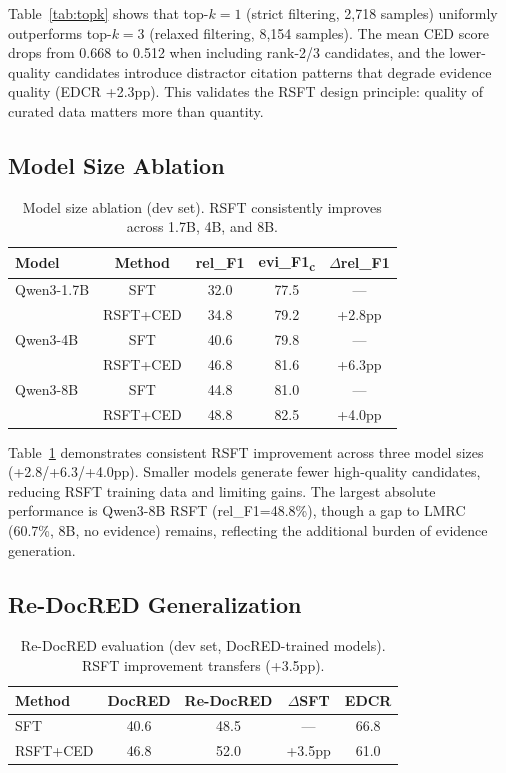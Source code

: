 \documentclass[11pt]{article}
\begin{document}
Table~\ref{tab:topk} shows that top-$k{=}1$ (strict filtering, 2{,}718 samples) uniformly outperforms top-$k{=}3$ (relaxed filtering, 8{,}154 samples).
The mean CED score drops from 0.668 to 0.512 when including rank-2/3 candidates, and the lower-quality candidates introduce distractor citation patterns that degrade evidence quality (EDCR +2.3pp).
This validates the RSFT design principle: quality of curated data matters more than quantity.

\subsection{Model Size Ablation}

\begin{table}[t]
\centering
\small
\begin{tabular}{lcccc}
\toprule
\textbf{Model} & \textbf{Method} & \textbf{rel\_F1} & \textbf{evi\_F1\textsubscript{c}} & \textbf{$\Delta$rel\_F1} \\
\midrule
Qwen3-1.7B & SFT & 32.0 & 77.5 & --- \\
 & RSFT+CED & 34.8 & 79.2 & +2.8pp \\
\midrule
Qwen3-4B & SFT & 40.6 & 79.8 & --- \\
 & RSFT+CED & 46.8 & 81.6 & +6.3pp \\
\midrule
Qwen3-8B & SFT & 44.8 & 81.0 & --- \\
 & RSFT+CED & 48.8 & 82.5 & +4.0pp \\
\bottomrule
\end{tabular}
\caption{Model size ablation (dev set). RSFT consistently improves across 1.7B, 4B, and 8B.}
\label{tab:model_size}
\end{table}

Table~\ref{tab:model_size} demonstrates consistent RSFT improvement across three model sizes (+2.8/+6.3/+4.0pp).
Smaller models generate fewer high-quality candidates, reducing RSFT training data and limiting gains.
The largest absolute performance is Qwen3-8B RSFT (rel\_F1=48.8\%), though a gap to LMRC (60.7\%, 8B, no evidence) remains, reflecting the additional burden of evidence generation.

\subsection{Re-DocRED Generalization}

\begin{table}[t]
\centering
\small
\begin{tabular}{lcccc}
\toprule
\textbf{Method} & \textbf{DocRED} & \textbf{Re-DocRED} & \textbf{$\Delta$SFT} & \textbf{EDCR} \\
\midrule
SFT & 40.6 & 48.5 & --- & 66.8 \\
RSFT+CED & 46.8 & 52.0 & +3.5pp & 61.0 \\
\bottomrule
\end{tabular}
\caption{Re-DocRED evaluation (dev set, DocRED-trained models). RSFT improvement transfers (+3.5pp).}
\label{tab:redocred}
\end{table}
\end{document}
